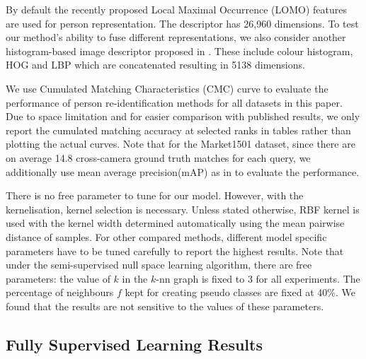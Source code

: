 \documentclass[10pt,twocolumn,letterpaper]{article}
\begin{document}
 \quad
By default the recently proposed  Local Maximal Occurrence (LOMO) features \cite{liao2015person} are used for person representation. 
The descriptor has 26,960 dimensions. To test our method's ability to fuse different representations, we also consider another histogram-based image descriptor
proposed in \cite{lisanti2014matching}. These include colour histogram, 
HOG  and  LBP  which are concatenated resulting in  5138 dimensions. 


 \quad We use Cumulated Matching Characteristics (CMC) curve to evaluate the performance of person re-identification methods for all datasets in this paper. 
Due to space limitation and for easier comparison with published results, we only report the cumulated matching accuracy at selected ranks in tables rather than plotting the actual curves.
Note that for the Market1501 dataset, since there are on average 14.8 cross-camera ground truth matches for each query, we additionally use mean average precision(mAP) as in \cite{zheng2015scalable} to evaluate the performance.

 \quad There is no free parameter to tune for our model. However, with the kernelisation, kernel selection is necessary. Unless stated otherwise, RBF kernel is used with the kernel width determined automatically using the mean pairwise distance of samples. For other compared methods, different model specific parameters have to be tuned carefully to report the highest results. Note that under the semi-supervised null space learning algorithm, there are free parameters: the value of $k$ in the $k$-nn graph is fixed to 3  for all experiments. The percentage of neighbours $f$ kept for creating pseudo classes are fixed at 40\%. We found that the results are not sensitive to the values of these parameters. 

\subsection{Fully Supervised Learning Results}
\end{document}
